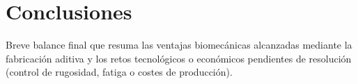 \section{Conclusiones}
\label{sec:conclusiones}
Breve balance final que resuma las ventajas biomecánicas alcanzadas mediante la fabricación aditiva y los retos tecnológicos o económicos pendientes de resolución (control de rugosidad, fatiga o costes de producción).
